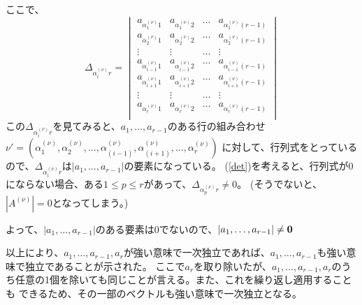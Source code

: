 \documentclass{jsarticle}
\begin{document}
ここで、
\begin{equation}
\Delta_{\alpha_i^{(\nu)}r} = 
	\begin{vmatrix}
		a_{\alpha_1^{(\nu)}1} & a_{\alpha_1^{(\nu)}2} & \hdots & a_{\alpha_1^{(\nu)}(r-1)} \\
		a_{\alpha_2^{(\nu)}1} & a_{\alpha_2^{(\nu)}2} & \hdots & a_{\alpha_2^{(\nu)}(r-1)} \\
		\vdots & \vdots & \hdots & \vdots \\
		a_{\alpha_{i-1}^{(\nu)}1} & a_{\alpha_{i-1}^{(\nu)}2} & \hdots & a_{\alpha_{i-1}^{(\nu)}(r-1)} \\
		a_{\alpha_{i+1}^{(\nu)}1} & a_{\alpha_{i+1}^{(\nu)}2} & \hdots & a_{\alpha_{i+1}^{(\nu)}(r-1)} \\
		\vdots & \vdots & \hdots & \vdots \\
		a_{\alpha_r^{(\nu)}1} & a_{\alpha_r^{(\nu)}2} & \hdots & a_{\alpha_r^{(\nu)}(r-1)} \\
	\end{vmatrix}
\end{equation}
この$\Delta_{\alpha_i^{(\nu)}r}$を見てみると、$a_1, \hdots, a_{r-1}$のある行の組み合わせ
$\nu' = (\alpha_1^{(\nu)}, \alpha_2^{(\nu)}, \hdots, \alpha_{(i-1)}^{(\nu)}, \alpha_{(i+1)}^{(\nu)}, \hdots,\alpha_r^{(\nu)})$
に対して、行列式をとっているので、$\Delta_{\alpha_i^{(\nu)}r}$は$|a_1, \hdots, a_{r-1}|$の要素になっている。
(\ref{det})を考えると、行列式が0にならない場合、ある$1 \leq p \leq r$があって、$\Delta_{\alpha_p^{(\nu)}r} \neq 0$。
(そうでないと、$|A^{(\nu)}| = 0$となってしまう。)

よって、$|a_1, \hdots, a_{r-1}|$のある要素は0でないので、$|a_1, \hdots, a_{r-1}| \neq \bf{0}$

以上により、$a_1, \hdots, a_{r-1}, a_r$が強い意味で一次独立であれば、$a_1, \hdots, a_{r-1}$も強い意味で独立であることが示された。
ここで$a_r$を取り除いたが、$a_1, \hdots, a_{r-1}, a_r$のうち任意の1個を除いても同じことが言える。また、これを繰り返し適用することも
できるため、その一部のベクトルも強い意味で一次独立となる。
\end{document}
